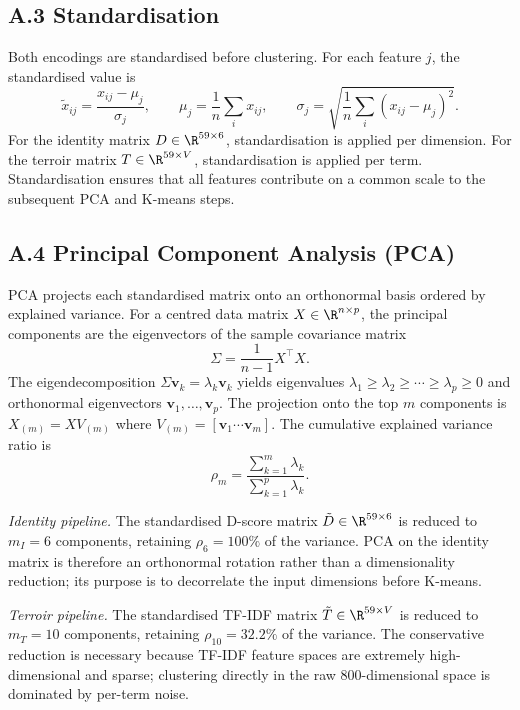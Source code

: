 \documentclass[11pt]{article}
\begin{document}
\subsection*{A.3 Standardisation}
Both encodings are standardised before clustering. For each feature $j$, the standardised value is
\[
\tilde{x}_{ij} = \frac{x_{ij} - \mu_j}{\sigma_j}, \qquad \mu_j = \frac{1}{n} \sum_i x_{ij}, \qquad \sigma_j = \sqrt{\frac{1}{n} \sum_i (x_{ij} - \mu_j)^2}.
\]
For the identity matrix $D \in \R^{59 \times 6}$, standardisation is applied per dimension. For the terroir matrix $T \in \R^{59 \times V}$, standardisation is applied per term. Standardisation ensures that all features contribute on a common scale to the subsequent PCA and K-means steps.

\subsection*{A.4 Principal Component Analysis (PCA)}
PCA projects each standardised matrix onto an orthonormal basis ordered by explained variance. For a centred data matrix $X \in \R^{n \times p}$, the principal components are the eigenvectors of the sample covariance matrix
\[
\Sigma = \frac{1}{n-1} X^\top X.
\]
The eigendecomposition $\Sigma \mathbf{v}_k = \lambda_k \mathbf{v}_k$ yields eigenvalues $\lambda_1 \geq \lambda_2 \geq \cdots \geq \lambda_p \geq 0$ and orthonormal eigenvectors $\mathbf{v}_1, \ldots, \mathbf{v}_p$. The projection onto the top $m$ components is $X_{(m)} = X V_{(m)}$ where $V_{(m)} = [\mathbf{v}_1 \cdots \mathbf{v}_m]$. The cumulative explained variance ratio is
\[
\rho_m = \frac{\sum_{k=1}^{m} \lambda_k}{\sum_{k=1}^{p} \lambda_k}.
\]

\textit{Identity pipeline.} The standardised D-score matrix $\tilde{D} \in \R^{59 \times 6}$ is reduced to $m_I = 6$ components, retaining $\rho_6 = 100\%$ of the variance. PCA on the identity matrix is therefore an orthonormal rotation rather than a dimensionality reduction; its purpose is to decorrelate the input dimensions before K-means.

\textit{Terroir pipeline.} The standardised TF-IDF matrix $\tilde{T} \in \R^{59 \times V}$ is reduced to $m_T = 10$ components, retaining $\rho_{10} = 32.2\%$ of the variance. The conservative reduction is necessary because TF-IDF feature spaces are extremely high-dimensional and sparse; clustering directly in the raw 800-dimensional space is dominated by per-term noise.
\end{document}
